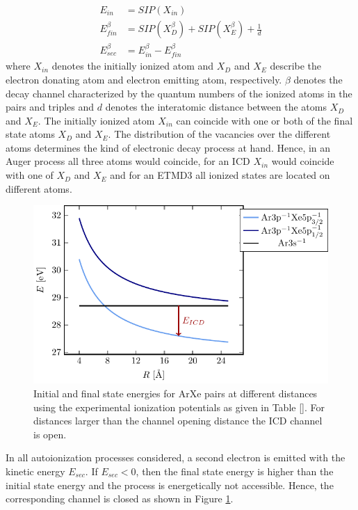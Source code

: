 \begin{align}
 E_{in}        &= SIP(X_{in}) \label{equation:E_in}\\
 E_{fin}^\beta &= SIP(X_{D}^\beta) + SIP(X_{E}^\beta) + \frac 1d
           \label{equation:E_fin}\\
 E_{sec}^\beta &= E_{in}^\beta - E_{fin}^\beta \label{equation:E_sec}
\end{align}
where $X_{in}$ denotes the initially ionized atom and
$X_{D}$ and $X_{E}$ describe the electron donating atom and electron
emitting atom, respectively.
$\beta$ denotes the decay channel characterized
by the quantum numbers of the ionized atoms in the pairs
and triples and $d$ denotes the interatomic distance between the atoms
$X_{D}$ and $X_{E}$. The initially ionized atom $X_{in}$ can
coincide with one or both of
the final state atoms
$X_{D}$ and $X_{E}$.
The distribution of the vacancies over the different
atoms determines the kind of electronic decay process at hand. Hence, in an
Auger process all three atoms would coincide, for an ICD $X_{in}$
would coincide with one of $X_{D}$ and $X_{E}$ and for an {ETMD}3
all ionized states are located on different atoms.

\begin{figure}[h]
 \centering
 \includegraphics[scale=0.7]{pics/channel_open_ICD.pdf}
 \caption{Initial and final state energies for ArXe pairs at different
          distances using the experimental ionization potentials as given
          in Table \ref{}. For distances larger than the channel opening
          distance the ICD channel is open.}
 \label{figure:channel_open_ICD}
\end{figure}

In all autoionization processes considered, a second electron
is emitted with the kinetic energy $E_{sec}$. If $E_{sec}<0$, then
the final state energy is higher than the initial state energy and the        
process is energetically not accessible. Hence, the corresponding channel     
is closed as shown in Figure \ref{figure:channel_open_ICD}.
                                                               
